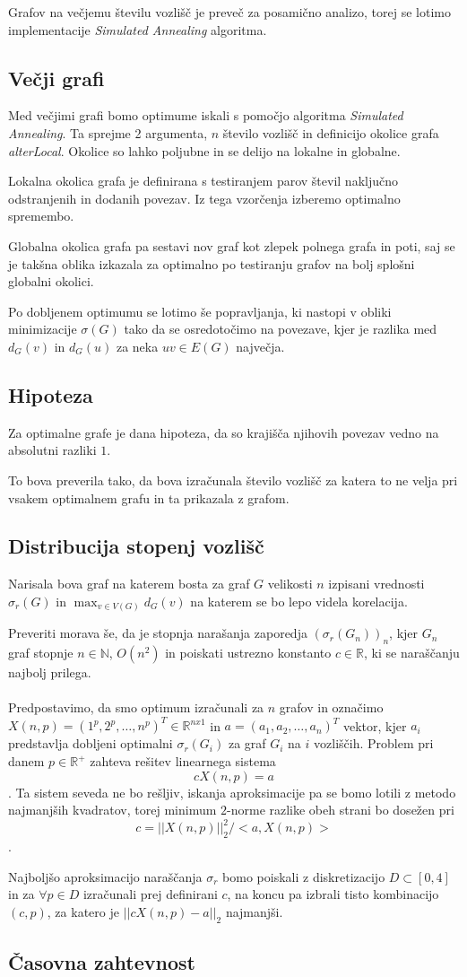 \documentclass[ letterpaper, titlepage, fleqn]{article}
\begin{document}
Grafov na večjemu številu vozlišč je preveč za posamično analizo, torej
se lotimo implementacije {\em Simulated Annealing} algoritma.

\subsection{Večji grafi}

Med večjimi grafi bomo optimume iskali s pomočjo algoritma
{\em Simulated Annealing}. Ta sprejme 2 argumenta,
{\em $n$} število vozlišč in definicijo
okolice grafa {\em alterLocal}.
Okolice so lahko poljubne in se delijo na lokalne in globalne.

Lokalna okolica grafa je definirana s testiranjem parov števil naključno
odstranjenih in dodanih povezav. Iz tega vzorčenja izberemo optimalno 
spremembo.

Globalna okolica grafa pa sestavi nov graf kot zlepek polnega grafa in poti, 
saj se je takšna oblika izkazala za optimalno po testiranju grafov na
bolj splošni globalni okolici.

Po dobljenem optimumu se lotimo še popravljanja, ki nastopi v obliki
minimizacije $\sigma(G)$ tako da se osredotočimo na povezave, kjer
je razlika med $d_G(v)$ in $d_G(u)$ za neka $uv \in E(G)$ največja.

\subsection{Hipoteza}

Za optimalne grafe je dana hipoteza, da so krajišča njihovih povezav
vedno na absolutni razliki $1$.

To bova preverila tako, da bova izračunala število vozlišč za katera
to ne velja pri vsakem optimalnem grafu in ta prikazala z grafom.

\subsection{Distribucija stopenj vozlišč}
Narisala bova graf na katerem bosta za graf $G$ velikosti $n$ izpisani
vrednosti $\sigma_r(G)$ in $\max_{v \in V(G)}d_G(v)$ na katerem
se bo lepo videla korelacija.

Preveriti morava še, da je stopnja narašanja zaporedja
$(\sigma_r(G_n))_n$, kjer $G_n$ graf stopnje $n \in \mathbb{N}$,
$O(n^2)$ in poiskati ustrezno konstanto $c \in \mathbb{R}$, ki 
se naraščanju najbolj prilega.
\\\\
Predpostavimo, da smo optimum izračunali za $n$ grafov in
označimo $X(n, p) = (1^p, 2^p, \dots, n^p)^T \in \mathbb{R}^{nx1}$ 
in $a = (a_1, a_2, \dots, a_n)^T$ vektor, kjer $a_i$ predstavlja
dobljeni optimalni $\sigma_r(G_i)$ za graf $G_i$ na $i$ vozliščih.
Problem pri danem $p \in \mathbb{R}^{+}$ zahteva rešitev linearnega sistema 
$$cX(n, p) = a$$.
Ta sistem seveda ne bo rešljiv, iskanja aproksimacije pa se bomo
lotili z metodo najmanjših kvadratov, torej minimum $2$-norme
razlike obeh strani bo dosežen pri
$$c = ||X(n, p)||_{2}^2 / <a, X(n, p)>$$.

Najboljšo aproksimacijo naraščanja $\sigma_r$ bomo poiskali 
z diskretizacijo $D \subset [0, 4]$ in za $\forall p \in D$ 
izračunali prej definirani $c$, na koncu pa izbrali tisto kombinacijo
$(c, p)$, za katero je $||cX(n, p) - a||_{2}$ najmanjši.

\subsection{Časovna zahtevnost}
\end{document}
